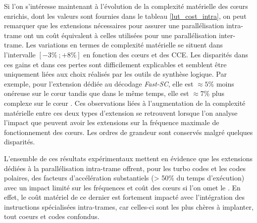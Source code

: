 \documentclass[../main.tex]{subfiles}
\begin{document}
Si l'on s'intéresse maintenant à l'évolution de la complexité matérielle des cœurs enrichis, dont les valeurs sont fournies dans le tableau \ref{lut_cost_intra}, on peut remarquer que les extensions nécessaires pour assurer une parallélisation intra-trame ont un coût équivalent à celles utilisées pour une parallélisation inter-trame. 
Les variations en termes de complexité matérielle se situent dans l'intervalle $[-3\%\ ; +8\%]$ en fonction des cœurs et des CCE. 
Les disparités dans ces gains et dans ces pertes sont difficilement explicables et semblent être uniquement liées aux choix réalisés par les outils de synthèse logique. 
Par exemple, pour l'extension dédiée au décodage \textit{Fast-SC}, elle est $\approx 5\%$ moins onéreuse sur le cœur \PicoRV\space tandis que dans le même temps, elle est $\approx 7\%$ plus complexe sur le cœur \IBEX.
Ces observations liées à l'augmentation de la complexité matérielle entre ces deux types d'extension se retrouvent lorsque l'on analyse l'impact que peuvent avoir les extensions sur la fréquence maximale de fonctionnement des cœurs. 
Les ordres de grandeur sont conservés malgré quelques disparités.

L'ensemble de ces résultats expérimentaux mettent en évidence que les extensions dédiées à la parallélisation intra-trame offrent, pour les turbo codes et les codes polaires, des facteurs d'accélération substantiels (> 50\% du temps d'exécution) avec un impact limité sur les fréquences et coût des cœurs si l'on omet le \PicoRV. 
En effet, le coût matériel de ce dernier est fortement impacté avec l'intégration des instructions spécialisées intra-trames, car celles-ci sont les plus chères à implanter, tout coeurs et codes confondus.




%
%
%
%
\end{document}
